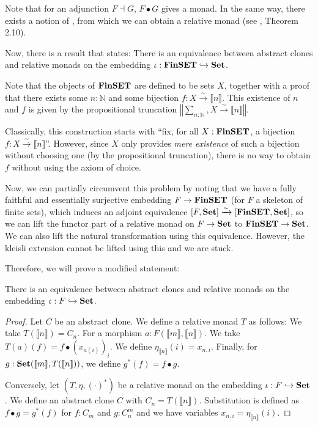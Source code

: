 \begin{remark}
  Note that for an adjunction $ F \dashv G $, $ F \bullet G $ gives a monad. In the same way, there exists a notion of , from which we can obtain a relative monad (see \cite{monads-endofunctors}, Theorem 2.10).
\end{remark}

\begin{remark}
  Now, there is a result that states: There is an equivalence between abstract clones and relative monads on the embedding $ \iota: \mathbf{FinSET} \hookrightarrow \mathbf{Set} $.

  Note that the objects of $ \mathbf{FinSET} $ are defined to be sets $ X $, together with a proof that there exists some $ n: \mathbb N $ and some bijection $ f: X \xrightarrow{\sim} \llbracket n \rrbracket $. This existence of $ n $ and $ f $ is given by the propositional truncation $ \left\Vert \sum_{n: \mathbb N}, X \xrightarrow{\sim} \llbracket n \rrbracket \right\Vert $.

  Classically, this construction starts with ``fix, for all $ X : \mathbf{FinSET} $, a bijection $ f: X \xrightarrow{\sim} \llbracket n \rrbracket $''. However, since $ X $ only provides \textit{mere existence} of such a bijection without choosing one (by the propositional truncation), there is no way to obtain $ f $ without using the axiom of choice.

  Now, we can partially circumvent this problem by noting that we have a fully faithful and essentially surjective embedding $ F \to \mathbf{FinSET} $ (for $ F $ a skeleton of finite sets), which induces an adjoint equivalence $ [F, \mathbf{Set}] \xrightarrow{\sim} [\mathbf{FinSET}, \mathbf{Set}] $, so we can lift the functor part of a relative monad on $ F \to \mathbf{Set} $ to $ \mathbf{FinSET} \to \mathbf{Set} $. We can also lift the natural transformation using this equivalence. However, the kleisli extension cannot be lifted using this and we are stuck.

  Therefore, we will prove a modified statement:
\end{remark}

\begin{lemma}
  There is an equivalence between abstract clones and relative monads on the embedding $ \iota: F \hookrightarrow \mathbf{Set} $.
\end{lemma}
\begin{proof}
  Let $ C $ be an abstract clone. We define a relative monad $ T $ as follows: We take $ T(\llbracket n \rrbracket) = C_n $. For a morphism $ a: F(\llbracket m \rrbracket, \llbracket n \rrbracket) $. We take $ T(a)(f) = f \bullet (x_{a(i)})_i $. We define $ \eta_{\llbracket n \rrbracket}(i) = x_{n, i} $. Finally, for $ g: \mathbf{Set}(\llbracket m \rrbracket, T(\llbracket n \rrbracket)) $, we define $ g^*(f) = f \bullet g $.

  Conversely, let $ (T, \eta, (\cdot)^*) $ be a relative monad on the embedding $ \iota: F \hookrightarrow \mathbf{Set} $. We define an abstract clone $ C $ with $ C_n = T(\llbracket n \rrbracket) $. Substitution is defined as $ f \bullet g = g^*(f) $ for $ f: C_m $ and $ g: C_n^m $ and we have variables $ x_{n, i} = \eta_{\llbracket n \rrbracket}(i) $.
\end{proof}

